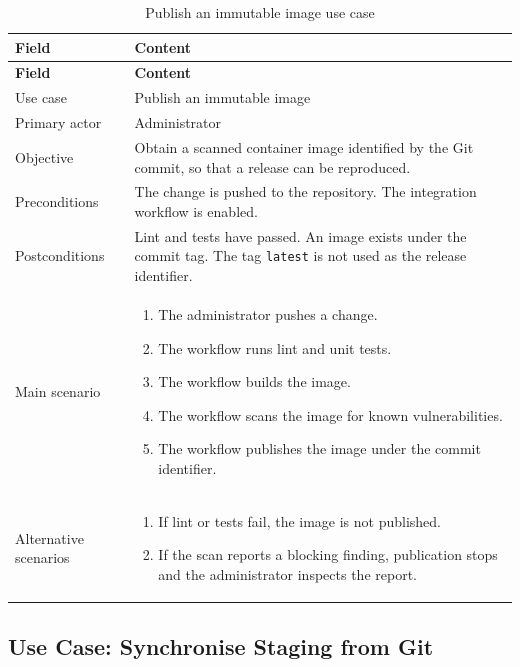 \begingroup
\footnotesize
\renewcommand{\arraystretch}{1.15}
\begin{longtable}{|L{3.2cm}|L{11.6cm}|}
\caption{Publish an immutable image use case}
\label{tab:use-case-publish-image} \\
\hline
{}
\textbf{Field} & \textbf{Content} \\
\hline
\endfirsthead
\hline
{}
\textbf{Field} & \textbf{Content} \\
\hline
\endhead
Use case & Publish an immutable image \\
\hline
Primary actor & Administrator \\
\hline
Objective & Obtain a scanned container image identified by the Git commit, so that a release can be reproduced. \\
\hline
Preconditions & The change is pushed to the repository. The integration workflow is enabled. \\
\hline
Postconditions & Lint and tests have passed. An image exists under the commit tag. The tag \nolinkurl{latest} is not used as the release identifier. \\
\hline
Main scenario & \begin{enumerate}[leftmargin=1.5em,itemsep=0.1em,topsep=0.2em]
  \item The administrator pushes a change.
  \item The workflow runs lint and unit tests.
  \item The workflow builds the image.
  \item The workflow scans the image for known vulnerabilities.
  \item The workflow publishes the image under the commit identifier.
\end{enumerate} \\
\hline
Alternative scenarios & \begin{enumerate}[label=A\arabic*.,leftmargin=2em,itemsep=0.1em,topsep=0.2em]
  \item If lint or tests fail, the image is not published.
  \item If the scan reports a blocking finding, publication stops and the administrator inspects the report.
\end{enumerate} \\
\hline
\end{longtable}
\endgroup

\subsection{Use Case: Synchronise Staging from Git}

